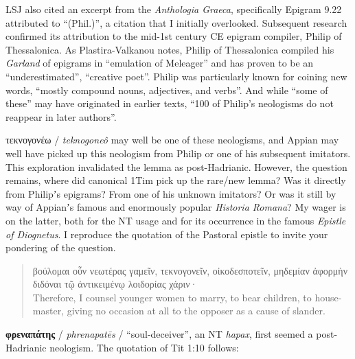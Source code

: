 LSJ also cited an excerpt from the \textit{Anthologia Graeca}, %
specifically Epigram 9.22 attributed to “(Phil.)”, %
a citation that I initially overlooked. %
Subsequent research confirmed its attribution to the mid-1st century CE epigram compiler, %
Philip of Thessalonica. %
As Plastira-Valkanou notes, %
Philip of Thessalonica compiled his \textit{Garland} of epigrams %
in “emulation of Meleager” and has proven to be an “underestimated”, “creative poet”. %
Philip was particularly known for coining new words, %
“mostly compound nouns, adjectives, and verbs”. %
And while “some of these” may have originated in earlier texts, %
“100 of Philip’s neologisms do not reappear in later authors”. %

τεκνογονέω / \textit{teknogoneô} may well be one of these neologisms, %
and Appian may well have picked up this neologism from Philip or one of his subsequent imitators. %
This exploration invalidated the lemma as post-Hadrianic. %
However, the question remains, where did canonical 1Tim pick up the rare/new lemma? %
Was it directly from Philipʼs epigrams? From one of his unknown imitators? %
Or was it still by way of Appianʼs famous and enormously popular \textit{Historia Romana}? %
My wager is on the latter, %
both for the NT usage and for its occurrence in the famous \textit{Epistle of Diognetus}. %
I reproduce the quotation of the Pastoral epistle to invite your pondering of the question. %

\vspace*{2mm} 
 \begin{quote}βούλομαι οὖν νεωτέρας γαμεῖν, τεκνογονεῖν,
 οἰκοδεσποτεῖν, μηδεμίαν ἀφορμὴν διδόναι τῷ ἀντικειμένῳ
 λοιδορίας χάριν· \\[1mm] %
 Therefore, I counsel younger women to marry, to bear children, %
 to house-master, giving no occasion at all to the opposer %
 as a cause of slander. \end{quote} %
 \vfill{}

\noindent{}\textbf{φρεναπάτης} / \textit{phrenapatēs} / “soul-deceiver”, %
an NT \textit{hapax}, first seemed a post-Hadrianic %
neologism. The quotation of Tit 1:10 follows: %
\vspace*{3mm}

